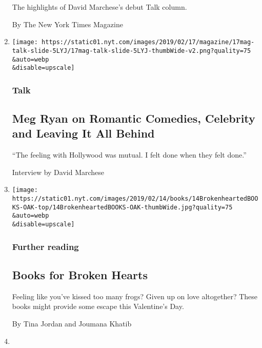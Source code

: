 \begin{enumerate}
  The highlights of David Marchese's debut Talk column.

  By The New York Times Magazine
\item
  \href{/interactive/2019/02/15/magazine/meg-ryan-romantic-comedy.html}{}

  \texttt{[image: https://static01.nyt.com/images/2019/02/17/magazine/17mag-talk-slide-5LYJ/17mag-talk-slide-5LYJ-thumbWide-v2.png?quality=75\\\&auto=webp\\\&disable=upscale]}

  \hypertarget{talk}{%
  \subsubsection{Talk}\label{talk}}

  \hypertarget{meg-ryan-on-romantic-comedies-celebrity-and-leaving-it-all-behind}{%
  \subsection{Meg Ryan on Romantic Comedies, Celebrity and Leaving It
  All
  Behind}\label{meg-ryan-on-romantic-comedies-celebrity-and-leaving-it-all-behind}}

  ``The feeling with Hollywood was mutual. I felt done when they felt
  done.''

  Interview by David Marchese
\item
  \href{/2019/02/13/books/books-for-broken-hearts.html}{}

  \texttt{[image: https://static01.nyt.com/images/2019/02/14/books/14BrokenheartedBOOKS-OAK-top/14BrokenheartedBOOKS-OAK-thumbWide.jpg?quality=75\\\&auto=webp\\\&disable=upscale]}

  \hypertarget{further-reading}{%
  \subsubsection{Further reading}\label{further-reading}}

  \hypertarget{books-for-broken-hearts}{%
  \subsection{Books for Broken Hearts}\label{books-for-broken-hearts}}

  Feeling like you've kissed too many frogs? Given up on love
  altogether? These books might provide some escape this Valentine's
  Day.

  By Tina Jordan and Joumana Khatib
\item
  \href{/2018/12/27/opinion/letters/nora-ephron.html}{}


\end{enumerate}
